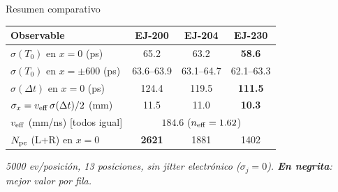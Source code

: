 \documentclass[aspectratio=169,9pt]{beamer}
\begin{document}
\begin{frame}{Resumen comparativo}
  \centering
  \begin{tabular}{lccc}
    \toprule
    Observable & EJ-200 & EJ-204 & EJ-230 \\
    \midrule
    $\sigma(T_0)$ en $x=0$ (ps)              & 65.2 & 63.2 & \textbf{58.6} \\
    $\sigma(T_0)$ en $x=\pm600$ (ps)         & 63.6--63.9 & 63.1--64.7 & 62.1--63.3 \\
    $\sigma(\Delta t)$ en $x=0$ (ps)          & 124.4 & 119.5 & \textbf{111.5} \\
    $\sigma_x = v_{\rm eff}\,\sigma(\Delta t)/2$ (mm) & 11.5 & 11.0 & \textbf{10.3} \\
    $v_{\rm eff}$ (mm/ns) [todos igual]       & \multicolumn{3}{c}{$184.6$  ($n_{\rm eff}=1.62$)} \\
    $N_{\rm pe}$ (L+R) en $x=0$              & \textbf{2621} & 1881 & 1402 \\
    \bottomrule
  \end{tabular}

  \vspace{0.5cm}
  \small{\textit{5000 ev/posición, 13 posiciones, sin jitter electrónico ($\sigma_j=0$).
  \textbf{En negrita}: mejor valor por fila.}}
\end{frame}
\end{document}

